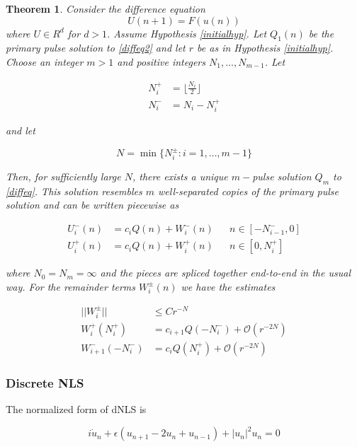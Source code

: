 \documentclass[12pt]{article}
\newtheorem{theorem}{Theorem}
\begin{document}
\begin{theorem}\label{transversemulti}
Consider the difference equation
\begin{equation}\label{diffeq2}
U(n+1) = F(u(n))
\end{equation}
where $U \in R^d$ for $d > 1$. Assume Hypothesis \ref{initialhyp}. Let $Q_1(n)$ be the primary pulse solution to \eqref{diffeq2} and let $r$ be as in Hypothesis \ref{initialhyp}. Choose an integer $m > 1$ and positive integers $N_1, \dots, N_{m-1}$. Let 

\begin{align*}
N_i^+ &= \lfloor \frac{N_i}{2} \rfloor \\
N_i^- &= N_i - N_i^+
\end{align*}

and let

\[
N = \min\{ N_i^\pm : i = 1, \dots, m-1 \}
\]

Then, for sufficiently large $N$, there exists a unique $m-$pulse solution $Q_m$ to \eqref{diffeq}. This solution resembles $m$ well-separated copies of the primary pulse solution and can be written piecewise as 

\begin{align}
U_i^-(n) &= c_i Q(n) + W_i^-(n) && n \in [-N_{i-1}^-, 0] \\
U_i^+(n) &= c_i Q(n) + W_i^+(n) && n \in [0, N_i^+]
\end{align}

where $N_0 = N_m = \infty$ and the pieces are spliced together end-to-end in the usual way. For the remainder terms $W_i^\pm(n)$ we have the estimates

\begin{align}
||W_i^\pm|| &\leq C r^{-N} \\
W_i^+(N_i^+) &= c_{i+1} Q(-N_i^-) + \mathcal{O}(r^{-2N}) \\
W_{i+1}^-(-N_i^-) &= c_i Q(N_i^+) + \mathcal{O}(r^{-2N})
\end{align}

\end{theorem}

\subsubsection{Discrete NLS}

The normalized form of dNLS is

\begin{equation}\label{dNLS}
i\dot{u}_n + \epsilon(u_{n+1} - 2 u_n + u_{n-1}) + |u_n|^2 u_n = 0
\end{equation}
\end{document}
